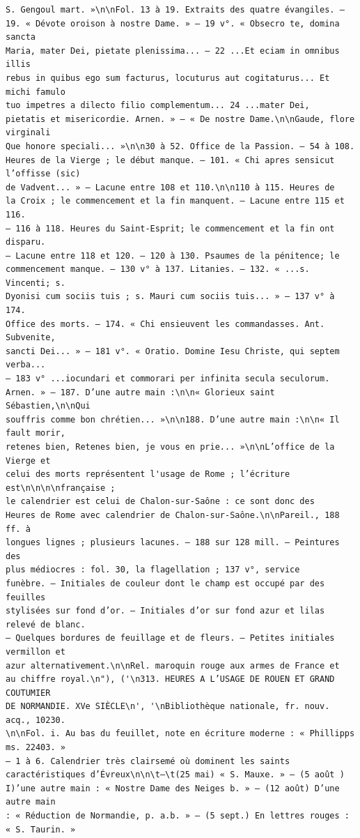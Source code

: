\documentclass[a4paper,12pt,twoside]{book}
\begin{document}
\begin{verbatim}
S. Gengoul mart. »\n\nFol. 13 à 19. Extraits des quatre évangiles. — 
19. « Dévote oroison à nostre Dame. » — 19 v°. « Obsecro te, domina sancta
Maria, mater Dei, pietate plenissima... — 22 ...Et eciam in omnibus illis 
rebus in quibus ego sum facturus, locuturus aut cogitaturus... Et michi famulo 
tuo impetres a dilecto filio complementum... 24 ...mater Dei, 
pietatis et misericordie. Arnen. » — « De nostre Dame.\n\nGaude, flore virginali 
Que honore speciali... »\n\n30 à 52. Office de la Passion. — 54 à 108.
Heures de la Vierge ; le début manque. — 101. « Chi apres sensicut l’offisse (sic)
de Vadvent... » — Lacune entre 108 et 110.\n\n110 à 115. Heures de
la Croix ; le commencement et la fin manquent. — Lacune entre 115 et 116. 
— 116 à 118. Heures du Saint-Esprit; le commencement et la fin ont disparu. 
— Lacune entre 118 et 120. — 120 à 130. Psaumes de la pénitence; le 
commencement manque. — 130 v° à 137. Litanies. — 132. « ...s. Vincenti; s.
Dyonisi cum sociis tuis ; s. Mauri cum sociis tuis... » — 137 v° à 174.
Office des morts. — 174. « Chi ensieuvent les commandasses. Ant. Subvenite,
sancti Dei... » — 181 v°. « Oratio. Domine Iesu Christe, qui septem verba... 
— 183 v° ...iocundari et commorari per infinita secula seculorum.
Arnen. » — 187. D’une autre main :\n\n« Glorieux saint Sébastien,\n\nQui 
souffris comme bon chrétien... »\n\n188. D’une autre main :\n\n« Il fault morir,
retenes bien, Retenes bien, je vous en prie... »\n\nL’office de la Vierge et 
celui des morts représentent l'usage de Rome ; l’écriture est\n\n\n\nfrançaise ;
le calendrier est celui de Chalon-sur-Saône : ce sont donc des
Heures de Rome avec calendrier de Chalon-sur-Saône.\n\nPareil., 188 ff. à 
longues lignes ; plusieurs lacunes. — 188 sur 128 mill. — Peintures des 
plus médiocres : fol. 30, la flagellation ; 137 v°, service
funèbre. — Initiales de couleur dont le champ est occupé par des feuilles 
stylisées sur fond d’or. — Initiales d’or sur fond azur et lilas relevé de blanc.
— Quelques bordures de feuillage et de fleurs. — Petites initiales vermillon et
azur alternativement.\n\nRel. maroquin rouge aux armes de France et 
au chiffre royal.\n"), ('\n313. HEURES A L’USAGE DE ROUEN ET GRAND COUTUMIER 
DE NORMANDIE. XVe SIÈCLE\n', '\nBibliothèque nationale, fr. nouv. acq., 10230.
\n\nFol. i. Au bas du feuillet, note en écriture moderne : « Phillipps ms. 22403. »
— 1 à 6. Calendrier très clairsemé où dominent les saints 
caractéristiques d’Évreux\n\n\t—\t(25 mai) « S. Mauxe. » — (5 août ) 
I)’une autre main : « Nostre Dame des Neiges b. » — (12 août) D’une autre main 
: « Réduction de Normandie, p. a.b. » — (5 sept.) En lettres rouges : « S. Taurin. »

\end{verbatim}
\end{document}

